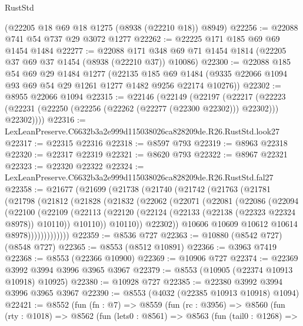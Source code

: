 \begin{lexlean}{RustStd}
\begin{coremodule}
    (@22205 @18 @69 @18 @1275 (@8938 (@22210 @18)) @8949)
@22256 := @22088 @741 @54 @737 @29 @3072 @1277
@22262 := @22225 @171 @185 @69 @69 @1454 @1484
@22277 := @22088
    @171
    @348
    @69
    @71
    @1454
    @1814
    (@22205 @37 @69 @37 @1454 (@8938 (@22210 @37)) @10086)
@22300 := @22088
    @185
    @54
    @69
    @29
    @1484
    @1277
    (@22135
      @185
      @69
      @1484
      (@9335 @22066 @1094 @93 @69 @54 @29 @1261 @1277 @1482 @9256 @22174 @10276))
@22302 := @8955 @22066 @1094
@22315 := @22146
    (@22149
      (@22197
        (@22217
          (@22223 (@22231 (@22250 (@22256 (@22262 (@22277 (@22300 @22302))) @22302))) @22302))))
@22316 := LexLeanPreserve.C6632b3a2e999d115038026ca828209de.R26.RustStd.look27
@22317 := @22315 @22316
@22318 := @8597 @793
@22319 := @8963 @22318
@22320 := @22317 @22319
@22321 := @8620 @793
@22322 := @8967 @22321
@22323 := @22320 @22322
@22324 := LexLeanPreserve.C6632b3a2e999d115038026ca828209de.R26.RustStd.fal27
@22358 := @21677
    (@21699
      (@21738
        (@21740
          (@21742
            (@21763
              (@21781
                (@21798
                  (@21812
                    (@21828
                      (@21832
                        (@22062
                          (@22071
                            (@22081
                              (@22086
                                (@22094
                                  (@22100
                                    (@22109
                                      (@22113
                                        (@22120
                                          (@22124 (@22133 (@22138 (@22323 @22324 @8978)) @10110))
                                          @10110))
                                      @10110))
                                  @22302))
                              @10606
                              @10609
                              @10612
                              @10614
                              @8978)))))))))))))
@22359 := @8536 @727
@22363 := @10880 (@8542 @727) (@8548 @727)
@22365 := @8553 (@8512 @10891)
@22366 := @3963 @7419
@22368 := @8553 (@22366 @10900)
@22369 := @10906 @727
@22374 := @22369 @3992 @3994 @3996 @3965 @3967
@22379 := @8553 (@10905 (@22374 @10913 @10918) @10925)
@22380 := @10928 @727
@22385 := @22380 @3992 @3994 @3996 @3965 @3967
@22390 := @8553 (@4032 (@22385 @10913 @10918) @1094)
@22421 := @8552
    (fun (fn : @7) =>
    @8559
      (fun (rc : @3956) =>
      @8560
        (fun (rty : @1018) =>
        @8562
          (fun (lets0 : @8561) =>
          @8563
            (fun (tail0 : @1268) =>

\end{coremodule}
\end{lexlean}

